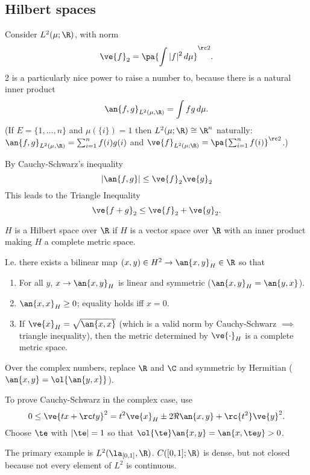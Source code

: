 
\subsection{Hilbert spaces}
Consider $L^2(\mu;\R)$, with norm
\[
\ve{f}_2=\pa{\int |f|^2\,d\mu}^{\rc 2}.
\]
2 is a particularly nice power to raise a number to, because there is a natural inner product
\[
\an{f,g}_{L^2(\mu,\R)}=\int fg\,d\mu.
\]
(If $E=\{1,\ldots, n\}$ and $\mu(\{i\})=1$ then $L^2(\mu;\R)\cong \R^n$ naturally: $\an{f,g}_{L^2(\mu,\R)}=\sum_{i=1}^n f(i)g(i)$ and $\ve{f}_{L^2(\mu;\R)}=\pa{\sum_{i=1}^n f(i)}^{\rc 2}$.)

By Cauchy-Schwarz's inequality 
\[
|\an{f,g}|\le \ve{f}_2\ve{g}_2
\]
This leads to the Triangle Inequality
\[
\ve{f+g}_2\le \ve{f}_2+\ve{g}_2.
\]
\begin{df}
$H$ is a Hilbert space over $\R$ if $H$ is a vector space over $\R$ with an inner product making $H$ a complete metric space.

I.e. there exists a bilinear map $(x,y)\in H^2\to \an{x,y}_H\in \R$ so that
\begin{enumerate}
\item
For all $y$, $x\to \an{x,y}_H$ is linear and symmetric ($\an{x,y}_H=\an{y,x}$).
\item
$\an{x,x}_H\ge 0$; equality holds iff $x=0$.
\item 
If $\ve{x}_H=\sqrt{\an{x,x}}$ (which is a valid norm by Cauchy-Schwarz $\implies$ triangle inequality), then the metric determined by $\ve{\cdot}_H$ is a complete metric space.
\end{enumerate}

Over the complex numbers, replace $\R$ and $\C$ and symmetric by Hermitian ($\an{x,y}=\ol{\an{y,x}}$).
\end{df}
To prove Cauchy-Schwarz in the complex case, use 
\[0\le \ve{tx+\rc ty}^2=t^2\ve{x}_H\pm 2\Re\an{x,y}+\rc{t^2}\ve{y}^2.\] 
Choose $\te$ with $|\te|=1$ so that $\ol{\te}\an{x,y}=\an{x,\te y}>0$.

The primary example is $L^2(\la_{[0,1]},\R)$. $C([0,1];\R)$ is dense, but not closed because not every element of $L^2$ is continuous.

